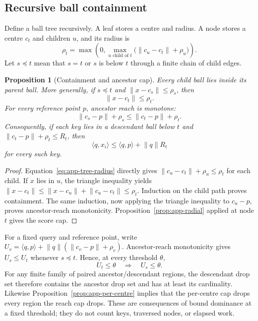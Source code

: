 \documentclass[11pt]{article}
\numberwithin{equation}{section}
\newtheorem{proposition}{Proposition}
\newcommand{\inner}[2]{\langle #1, #2\rangle}
\begin{document}
\subsection{Recursive ball containment}

Define a ball tree recursively. A leaf stores a centre and radius. A node stores a centre $c_t$ and children
$u$, and its radius is
\begin{equation}\label{eq:app-tree-radius}
\rho_t=\max\!\left(0,\max_{u\text{ child of }t}
  \bigl(\lVert c_u-c_t\rVert+\rho_u\bigr)\right).
\end{equation}
Let $s\preceq t$ mean that $s=t$ or $s$ is below $t$ through a finite chain of child edges.

\begin{proposition}[Containment and ancestor cap]\label{prop:app-tree}
Every child ball lies inside its parent ball. More generally, if $s\preceq t$ and
$\lVert x-c_s\rVert\le\rho_s$, then
\[
\lVert x-c_t\rVert\le\rho_t.
\]
For every reference point $p$, ancestor reach is monotone:
\[
\lVert c_s-p\rVert+\rho_s
\le \lVert c_t-p\rVert+\rho_t.
\]
Consequently, if each key lies in a descendant ball below $t$ and
$\lVert c_t-p\rVert+\rho_t\le R_t$, then
\[
\inner{q}{x_i}\le\inner{q}{p}+\lVert q\rVert R_t
\]
for every such key.
\end{proposition}
\begin{proof}
Equation~\eqref{eq:app-tree-radius} directly gives
$\lVert c_u-c_t\rVert+\rho_u\le\rho_t$ for each child. If $x$ lies in $u$, the triangle inequality yields
$\lVert x-c_t\rVert\le\lVert x-c_u\rVert+\lVert c_u-c_t\rVert\le\rho_t$.
Induction on the child path proves containment. The same induction, now applying the triangle inequality to
$c_u-p$, proves ancestor-reach monotonicity. Proposition~\ref{prop:app-radial} applied at node $t$ gives the
score cap.
\end{proof}

For a fixed query and reference point, write
$U_v=\inner{q}{p}+\lVert q\rVert(\lVert c_v-p\rVert+\rho_v)$. Ancestor-reach monotonicity gives
$U_s\le U_t$ whenever $s\preceq t$. Hence, at every threshold $\theta$,
\[
U_t\le\theta\quad\Longrightarrow\quad U_s\le\theta.
\]
For any finite family of paired ancestor/descendant regions, the descendant drop set therefore contains the
ancestor drop set and has at least its cardinality. Likewise Proposition~\ref{prop:app-per-centre} implies that
the per-centre cap drops every region the reach cap drops. These are consequences of bound dominance at a
fixed threshold; they do not count keys, traversed nodes, or elapsed work.
\end{document}
